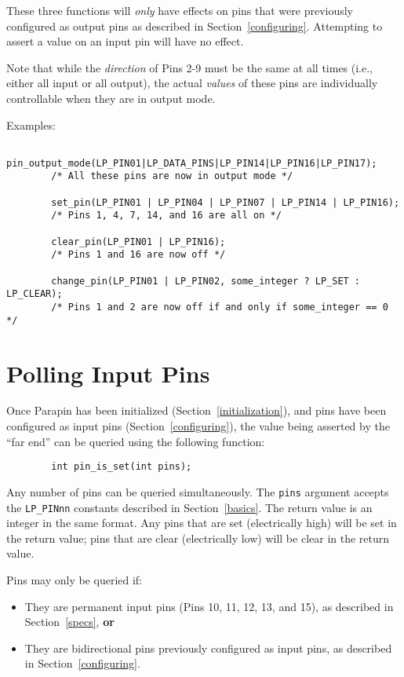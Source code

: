 \documentclass{article}
\begin{document}
These three functions will {\em only} have effects on pins that were
previously configured as output pins as described in
Section~\ref{configuring}.  Attempting to assert a value on an input
pin will have no effect.

Note that while the {\em direction} of Pins 2-9 must be the same at
all times (i.e., either all input or all output), the actual {\em
values} of these pins are individually controllable when they are in
output mode.

Examples:
\begin{verbatim}
        pin_output_mode(LP_PIN01|LP_DATA_PINS|LP_PIN14|LP_PIN16|LP_PIN17);
        /* All these pins are now in output mode */

        set_pin(LP_PIN01 | LP_PIN04 | LP_PIN07 | LP_PIN14 | LP_PIN16);
        /* Pins 1, 4, 7, 14, and 16 are all on */

        clear_pin(LP_PIN01 | LP_PIN16);
        /* Pins 1 and 16 are now off */

        change_pin(LP_PIN01 | LP_PIN02, some_integer ? LP_SET : LP_CLEAR);
        /* Pins 1 and 2 are now off if and only if some_integer == 0 */
\end{verbatim}

\section{Polling Input Pins}
\label{polling}

Once Parapin has been initialized (Section~\ref{initialization}), and
pins have been configured as input pins (Section~\ref{configuring}),
the value being asserted by the ``far end'' can be queried using the
following function:
\begin{verbatim}
        int pin_is_set(int pins);
\end{verbatim}

Any number of pins can be queried simultaneously.  The {\tt pins}
argument accepts the {\tt LP\_PINnn} constants described in
Section~\ref{basics}.  The return value is an integer in the same
format.  Any pins that are set (electrically high) will be set in the
return value; pins that are clear (electrically low) will be clear in
the return value.

Pins may only be queried if:
\begin{itemize}
\item They are permanent input pins (Pins 10, 11, 12, 13, and 15), as
described in Section~\ref{specs}, {\bf or}
\item They are bidirectional pins previously configured as input pins,
as described in Section~\ref{configuring}.
\end{itemize}
\end{document}
